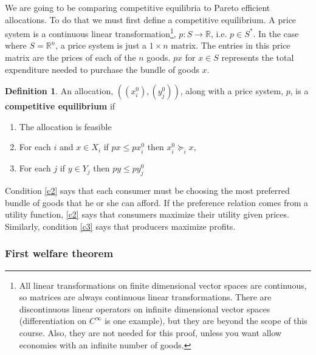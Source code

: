 \documentclass[12pt,reqno]{amsart}
\theoremstyle{definition}
\newtheorem{definition}{Definition}[section]
\def\R{\mathbb{R}}
\newcommand{\prefeq}{\succeq}
\begin{document}
We are going to be comparing competitive equilibria to Pareto
efficient allocations. To do that we must first define a competitive
equilibrium. A price system is a continuous linear
transformation\footnote{All linear transformations on finite
  dimensional vector spaces are continuous, so matrices are always
  continuous linear transformations. There are discontinuous linear
  operators on infinite dimensional vector spaces (differentiation on
  $C^\infty$ is one example), but they are beyond the scope of this
  course. Also, they are not needed for this proof, unless you want
  allow economies with an infinite number of goods.}, $p:S \rightarrow
\R$, i.e. $p \in S^\ast$. In the case where $S = \R^n$, a price system
is just a $1 \times n$ matrix. The entries in this price matrix are
the prices of each of the $n$ goods. $px$ for $x \in S$ represents the
total expenditure needed to purchase the bundle of goods $x$.
\begin{definition}
  An allocation, $((x_i^0),(y_j^0))$, along with a price system, $p$,
  is a \textbf{competitive equilibrium} if 
  \renewcommand{\theenumi}{C\arabic{enumi}}
  \begin{enumerate}
  \item\label{c1} The allocation is feasible
  \item\label{c2} For each $i$ and $x \in X_i$ if $px \leq px_i^0$
    then $x_i^0 \prefeq_i x$,
  \item\label{c3} For each $j$ if $y \in Y_j$ then $p y \leq p y_j^0$
  \end{enumerate}
  \renewcommand{\theenumi}{\roman{enumi}}
\end{definition}
Condition \ref{c2} says that each consumer must be choosing the most
preferred bundle of goods that he or she can afford. If the preference
relation comes from a utility function, \ref{c2} says that consumers
maximize their utility given prices. Similarly, condition \ref{c3}
says that producers maximize profits.

\subsubsection{First welfare theorem}
\end{document}
